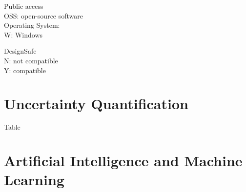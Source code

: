 \noindent Public access\\
OSS: open-source software\\

\noindent Operating System:\\
W: Windows

\noindent DesignSafe\\
N: not compatible\\
Y: compatible



\section{Uncertainty Quantification}
\label{sec:tools_list_uq}

Table

\section{Artificial Intelligence and Machine Learning}
\label{sec:tools_list_ai}
